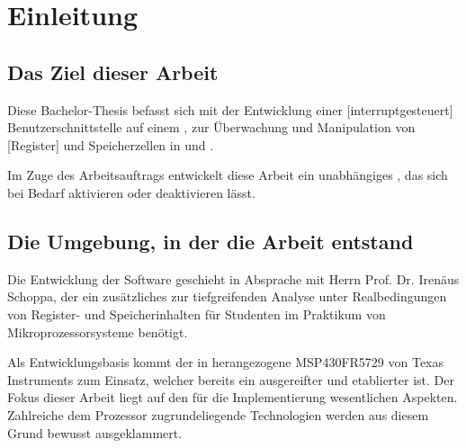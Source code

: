 
\chapter{Einleitung}
\label{cha:Einleitung}

\section{Das Ziel dieser Arbeit}
\label{sec:ZielDerArbeit}

Diese Bachelor-Thesis befasst sich mit der Entwicklung einer [interruptgesteuert] Benutzerschnittstelle auf einem , zur \"Uberwachung und Manipulation von [Register] und Speicherzellen in  und .

Im Zuge des Arbeitsauftrags entwickelt diese Arbeit ein unabh\"angiges , das sich bei Bedarf aktivieren oder deaktivieren l\"asst.

\section{Die Umgebung, in der die Arbeit entstand}
\label{sec:EntstehungsUmgebungArbeit}

Die Entwicklung der Software geschieht in Absprache mit Herrn Prof. Dr. Iren\"aus Schoppa, der ein zus\"atzliches  zur tiefgreifenden Analyse unter Realbedingungen von Register- und Speicherinhalten f\"ur Studenten im Praktikum von Mikroprozessorsysteme ben\"otigt.

Als Entwicklungsbasis kommt der in  herangezogene MSP430FR5729 von Texas Instruments zum Einsatz, welcher bereits ein ausgereifter und etablierter  ist. Der Fokus dieser Arbeit liegt auf den f\"ur die Implementierung wesentlichen Aspekten. Zahlreiche dem Prozessor zugrundeliegende Technologien werden aus diesem Grund bewusst ausgeklammert. 

